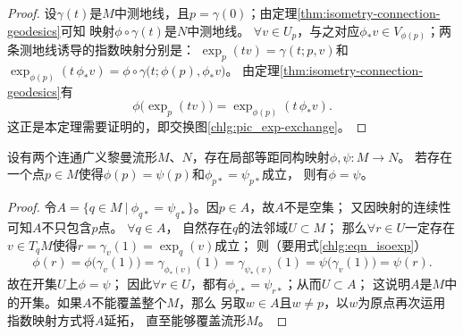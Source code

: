 \begin{proof}
    设$\gamma(t)$是$M$中测地线，且$p=\gamma(0)$；由定理\ref{thm:isometry-connection-geodesics}可知
    映射$\phi\circ\gamma(t)$是$N$中测地线。
    $\forall v\in U_p$，与之对应$\phi_* v \in V_{\phi(p)}$；两条测地线诱导的指数映射分别是：
    $\exp_p(t v)=\gamma(t;p,v)$和
    $\exp_{\phi(p)}(t\, \phi_*v)=\phi\circ\gamma\bigl(t;\phi(p),\phi_* v\bigr)$。
    由定理\ref{thm:isometry-connection-geodesics}有
    \begin{equation}\label{chlg:eqn_isoexp}
        \phi \bigl(\exp_p(t v)\bigr) = \exp_{\phi(p)}(t\, \phi_* v ) .
    \end{equation}
    这正是本定理需要证明的，即交换图\ref{chlg:pic_exp-exchange}。
\end{proof}

\begin{proposition}
    设有两个连通广义黎曼流形$M$、$N$，存在局部等距同构映射$\phi,\psi:M\to N$。
    若存在一个点$p\in M$使得$\phi(p)=\psi(p)$和$\phi_{p*} = \psi_{p*}$成立，
    则有$\phi=\psi$。
\end{proposition}
\begin{proof}
    令$A=\{ q\in M \ | \  \phi_{q*} = \psi_{q*}\}$。因$p\in A$，故$A$不是空集；
    又因映射的连续性可知$A$不只包含$p$点。    $\forall q\in A$，
    自然存在$q$的法邻域$U\subset M$；
    那么$\forall r\in U$一定存在$v\in T_q M$使得$r=\gamma_v(1)=\exp_q(v)$成立；
    则（要用式\eqref{chlg:eqn_isoexp}）
    \begin{equation}
        \phi(r) = \phi \bigl(\gamma_v(1)\bigr)= \gamma_{\phi_*(v)} (1)
        = \gamma_{\psi_*(v)} (1) =\psi \bigl(\gamma_v(1)\bigr) =\psi(r).
    \end{equation}
    故在开集$U$上$\phi=\psi$；
    因此$\forall r\in U$，都有$\phi_{r*} = \psi_{r*}$；从而$U\subset A$；
    这说明$A$是$M$中的开集。如果$A$不能覆盖整个$M$，那么
    另取$w\in A$且$w\neq p$，以$w$为原点再次运用指数映射方式将$A$延拓，
    直至能够覆盖流形$M$。
\end{proof}

